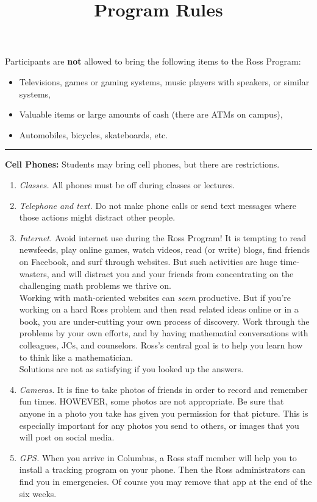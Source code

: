 \documentclass{ross}
\title{Program Rules}
\begin{document}
\maketitle
Participants are {\bf not} allowed to bring the following items to the Ross
Program:
\begin{itemize}
\item Televisions, games or gaming systems, music players with speakers, or similar systems,
\item Valuable items or large amounts of cash (there are ATMs on campus),
\item Automobiles, bicycles, skateboards, etc.
\end{itemize}



\bigskip\hrule
\textbf{Cell Phones:} Students may bring cell phones, but there are restrictions. 
\begin{enumerate}[label=(\roman*),itemsep=0.5em,topsep= 0em]

\item {\it Classes.}  All phones must be off during classes or lectures. 

\item {\it Telephone and text.}  Do not make phone calls or send text messages 
where those actions might distract other people.

\item {\it Internet.} Avoid internet use during the Ross Program! It is tempting to read newsfeeds, play online games, watch videos, read (or write) blogs, find friends on Facebook, and surf through websites.  But such activities are huge time-wasters, and will distract you and your friends from concentrating on the challenging math problems we thrive on.  \\[5pt]
Working with math-oriented websites can {\it seem} productive. But if you're working on a hard Ross problem and then read related ideas online or in a book, you are under-cutting your own process of discovery. Work through the problems by your own efforts, and by having mathematial conversations with colleagues, JCs, and counselors.  Ross's central goal is to help you learn how to think like a mathematician.\\
\hspace*{1cm} Solutions are not as satisfying if you looked up the answers.

\item {\it Cameras.}  It is fine to take photos of friends in order to record and remember fun times.  HOWEVER, some photos are not appropriate.  Be sure that anyone in a photo you take has given you permission for that picture.  This is especially important for any photos you send to others, or images that you will post on social media. 

\item{\it  GPS.}  When you arrive in Columbus, a Ross staff member will help you to install a tracking program on your phone.  Then the Ross administrators can find you in emergencies. Of course you may remove that app at the end of the six weeks.
\end{enumerate}
\end{document}
